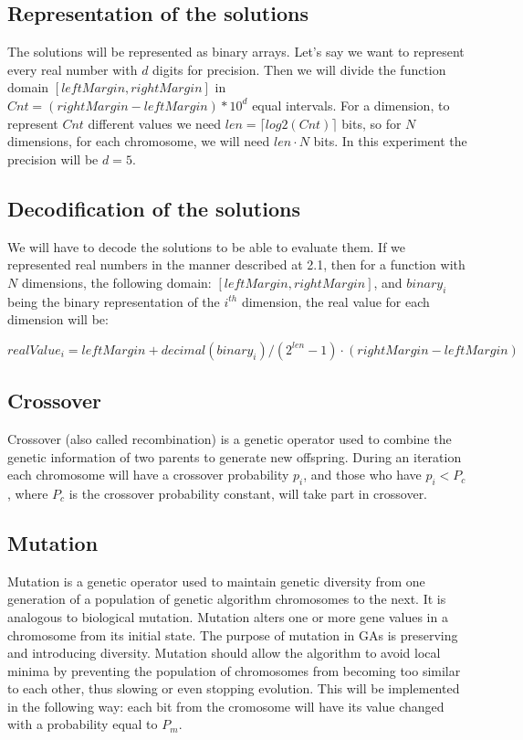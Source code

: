 \documentclass[a4paper]{article}
\begin{document}
	\subsection{Representation of the solutions}
	
	The solutions will be represented as binary arrays. Let's say we want to represent every real number with $d$ digits for precision. Then we will divide the function domain $\left[leftMargin, rightMargin\right]$ in $Cnt=(rightMargin-leftMargin)*10^d$ equal intervals. For a dimension, to represent $Cnt$ different values we need $len=\lceil log2(Cnt)\rceil$ bits, so for $N$ dimensions, for each chromosome, we will need $len \cdot N$ bits. In this experiment the precision will be $d = 5$.
	
	\subsection{Decodification of the solutions}
	
	We will have to decode the solutions to be able to evaluate them. If we represented real numbers in the manner described at 2.1, then for a function with $N$ dimensions, the following domain: $\left[leftMargin, rightMargin\right]$, and $binary_i$ being the binary representation of the $i^{th}$ dimension, the real value for each dimension will be:
	
	$$ realValue_i = leftMargin+decimal(binary_i)/(2^{len}-1) \cdot (rightMargin - leftMargin) $$
	
	\subsection{Crossover}
	
	Crossover (also called recombination) is a genetic operator used to combine the genetic information of two parents to generate new offspring. \cite{Crossover} During an iteration each chromosome will have a crossover probability $p_i$, and those who have $p_i < P_{c}$, where $P_{c}$ is the crossover probability constant, will take part in crossover.
	
	\subsection{Mutation}
	
	Mutation is a genetic operator used to maintain genetic diversity from one generation of a population of genetic algorithm chromosomes to the next. It is analogous to biological mutation. Mutation alters one or more gene values in a chromosome from its initial state. The purpose of mutation in GAs is preserving and introducing diversity. Mutation should allow the algorithm to avoid local minima by preventing the population of chromosomes from becoming too similar to each other, thus slowing or even stopping evolution.\cite{Mutation} This will be implemented in the following way: each bit from the cromosome will have its value changed with a probability equal to $P_{m}$.
	
\end{document}
